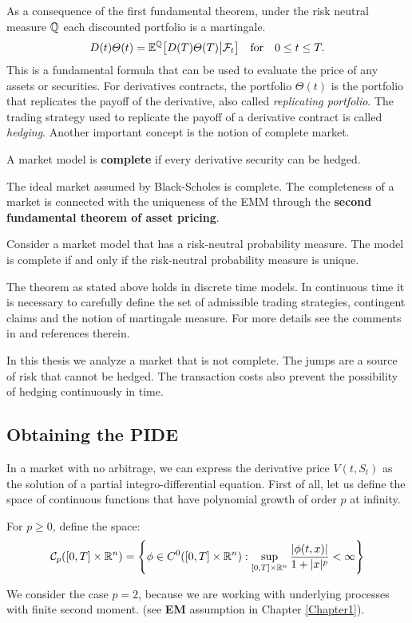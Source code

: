 As a consequence of the first fundamental theorem, under the risk neutral measure $\mathbb{Q}$ each discounted portfolio is a martingale.  
\begin{equation}\label{derivative_price}
 D(t) \varTheta(t) = \mathbb{E}^{\mathbb{Q}} \bigl[ D(T) \varTheta(T) \big| \mathcal{F}_t \bigr] \quad \mbox{for} \quad 0\leq t \leq T.
\end{equation}
This is a fundamental formula that can be used to evaluate the price of any assets or securities. For derivatives contracts, the portfolio $\varTheta(t)$ is the portfolio that
replicates the payoff of the derivative, also called \emph{replicating portfolio}. The trading strategy used to replicate the payoff of a derivative contract is called \emph{hedging}. 
Another important concept is the notion of complete market.
\begin{Definition}
 A market model is \textbf{complete} if every derivative security can be hedged. 
\end{Definition}
The ideal market assumed by Black-Scholes is complete. The completeness of a market is connected with the uniqueness of the EMM through the
\textbf{second fundamental theorem of asset pricing}.
\begin{Theorem}
 Consider a market model that has a risk-neutral probability measure. The model is complete if and only if the risk-neutral probability measure is unique.
\end{Theorem}
The theorem as stated above holds in discrete time models. In continuous time it is necessary to carefully define the set of admissible trading strategies, contingent claims and the
notion of martingale measure. For more details see the comments in \cite{Cont} and references therein.

In this thesis we analyze a market that is not complete. The jumps are a source of risk that cannot be hedged. The transaction costs also prevent the possibility of hedging 
continuously in time.


\subsection{Obtaining the PIDE}

In a market with no arbitrage, we can express the derivative price $V(t,S_t)$ as the solution of a partial integro-differential equation.
First of all, let us define the space of continuous functions that have polynomial growth of order $p$ at infinity.
\begin{Definition}\label{Cp}
 For $p\geq 0$, define the space:
\begin{equation}
 \mathcal{C}_p([0,T] \times \mathbb{R}^n) = \left\{  \phi \in C^0([0,T] \times \mathbb{R}^n) : \sup_{[0,T] \times \mathbb{R}^n} 
 \frac{|\phi(t,x)|}{1+|x|^p} <\infty   \right\} 
\end{equation}
\end{Definition}
We consider the case $p=2$, because we are working with underlying processes with finite second moment. (see \textbf{EM} assumption in Chapter \ref{Chapter1}).

